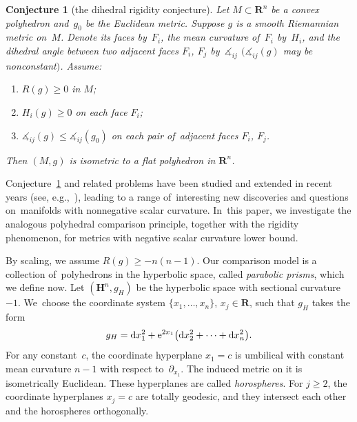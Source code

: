 \documentclass[10pt,a4paper]{amsart}
\numberwithin{equation}{section}
\newtheorem{conj}[prop]{Conjecture}
\theoremstyle{definition}
\newcommand{\HH}{\mathbf{H}}
\newcommand{\RR}{\mathbf{R}}
\begin{document}
\begin{conj}[the dihedral rigidity conjecture]\label{conj.dihedral.rigidity}
Let $M\subset \RR^n$ be a convex polyhedron and~$g_0$ be the Euclidean metric. Suppose $g$ is a smooth Riemannian metric on~$M$. Denote its faces by~$F_i$, the mean curvature of~$F_i$ by~$H_i$, and the dihedral angle between two adjacent faces $F_i$, $F_j$ by~$\measuredangle_{ij}$ $(\measuredangle_{ij}(g)$ may be nonconstant$)$. Assume:
\begin{enumerate}\itemsep=0pt
\item[${\rm 1)}$] $R(g)\ge 0$ in $M$;
\item[${\rm 2)}$] $H_i(g)\ge 0$ on each face $F_i$;
 \item[${\rm 3)}$] $\measuredangle_{ij}(g)\le \measuredangle_{ij}(g_0)$ on each pair of~adjacent faces $F_i$, $F_j$.
\end{enumerate}
Then $(M,g)$ is isometric to a flat polyhedron in $\RR^n$.
\end{conj}

Conjecture~\ref{conj.dihedral.rigidity} and related problems have been studied and extended in recent years (see, e.g.,~\cite{Gromov2018Metric,gromov2018IAS,gromov2019lectures,Li2017polyhedron,li2019dihedral,LiMantoulidis2018positive,miao2019measuring}), leading to a range of~interesting new discoveries and questions on~manifolds with nonnegative scalar curvature. In~this paper, we investigate the analogous polyhedral comparison principle, together with the rigidity phenomenon, for metrics with nega\-tive scalar curvature lower bound.

By scaling, we assume $R(g)\ge -n(n-1)$. Our comparison model is a collection of~polyhedrons in the hyperbolic space, called \textit{parabolic prisms}, which we define now. Let $(\HH^n,g_H)$ be the hyperbolic space with sectional curvature $-1$. We~choose the coordinate system $\{x_1,\dots,x_n\}$, $x_j\in \RR$, such that $g_H$ takes the form
\[g_H={\rm d}x_1^2+{\rm e}^{2x_1}\big({\rm d}x_2^2+\cdots+{\rm d}x_n^2\big).\]
For any constant~$c$, the coordinate hyperplane $x_1=c$ is umbilical with constant mean curvature $n-1$ with respect to~$\partial_{x_1}$. The induced metric on it is isometrically Euclidean. These hyperplanes are called \textit{horospheres}. For $j\ge 2$, the coordinate hyperplanes $x_j=c$ are totally geodesic, and they intersect each other and the horospheres orthogonally.
\end{document}
